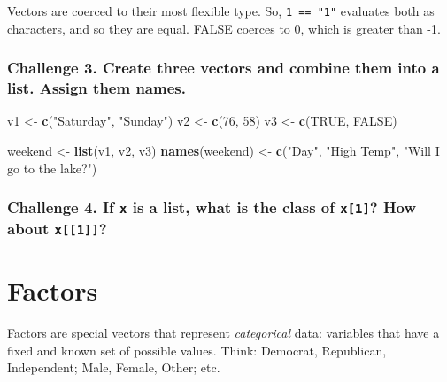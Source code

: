 \documentclass[]{book}
\newenvironment{Shaded}{\begin{snugshade}}{\end{snugshade}}
\newcommand{\KeywordTok}[1]{\textcolor[rgb]{0.13,0.29,0.53}{\textbf{#1}}}
\newcommand{\DecValTok}[1]{\textcolor[rgb]{0.00,0.00,0.81}{#1}}
\newcommand{\StringTok}[1]{\textcolor[rgb]{0.31,0.60,0.02}{#1}}
\newcommand{\OtherTok}[1]{\textcolor[rgb]{0.56,0.35,0.01}{#1}}
\newcommand{\NormalTok}[1]{#1}
\begin{document}
Vectors are coerced to their most flexible type. So, \texttt{1\ ==\ "1"}
evaluates both as characters, and so they are equal. FALSE coerces to 0,
which is greater than -1.

\subsubsection*{Challenge 3. Create three vectors and combine them into
a list. Assign them
names.}\label{challenge-3.-create-three-vectors-and-combine-them-into-a-list.-assign-them-names.}

\begin{Shaded}
\begin{Highlighting}[]
\NormalTok{v1 <-}\StringTok{ }\KeywordTok{c}\NormalTok{(}\StringTok{"Saturday"}\NormalTok{, }\StringTok{"Sunday"}\NormalTok{)}
\NormalTok{v2 <-}\StringTok{ }\KeywordTok{c}\NormalTok{(}\DecValTok{76}\NormalTok{, }\DecValTok{58}\NormalTok{)}
\NormalTok{v3 <-}\StringTok{ }\KeywordTok{c}\NormalTok{(}\OtherTok{TRUE}\NormalTok{, }\OtherTok{FALSE}\NormalTok{)}

\NormalTok{weekend <-}\StringTok{ }\KeywordTok{list}\NormalTok{(v1, v2, v3)}
\KeywordTok{names}\NormalTok{(weekend) <-}\StringTok{ }\KeywordTok{c}\NormalTok{(}\StringTok{"Day"}\NormalTok{, }\StringTok{"High Temp"}\NormalTok{, }\StringTok{"Will I go to the lake?"}\NormalTok{)}
\end{Highlighting}
\end{Shaded}

\subsubsection*{\texorpdfstring{Challenge 4. If \texttt{x} is a list,
what is the class of \texttt{x{[}1{]}}? How about
\texttt{x{[}{[}1{]}{]}}?}{Challenge 4. If x is a list, what is the class of x{[}1{]}? How about x{[}{[}1{]}{]}?}}\label{challenge-4.-if-x-is-a-list-what-is-the-class-of-x1-how-about-x1}

\hypertarget{factors}{\section{Factors}\label{factors}}

Factors are special vectors that represent \emph{categorical} data:
variables that have a fixed and known set of possible values. Think:
Democrat, Republican, Independent; Male, Female, Other; etc.
\end{document}

